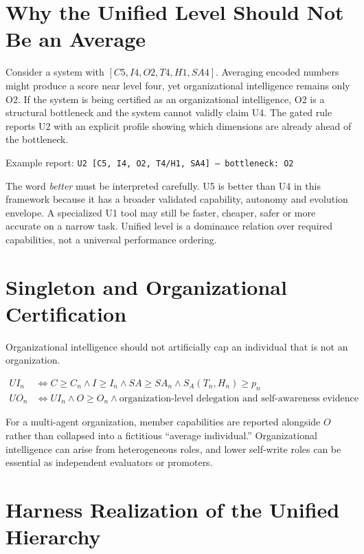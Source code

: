 \documentclass[11pt]{article}
\theoremstyle{definition}
\begin{document}
\section{Why the Unified Level Should Not Be an Average}

Consider a system with $[C5, I4, O2, T4, H1, SA4]$. Averaging encoded numbers might produce a score near level four, yet organizational intelligence remains only O2. If the system is being certified as an organizational intelligence, O2 is a structural bottleneck and the system cannot validly claim U4. The gated rule reports U2 with an explicit profile showing which dimensions are already ahead of the bottleneck.

\begin{center}
Example report: \texttt{U2 [C5, I4, O2, T4/H1, SA4] --- bottleneck: O2}
\end{center}

The word \emph{better} must be interpreted carefully. U5 is better than U4 in this framework because it has a broader validated capability, autonomy and evolution envelope. A specialized U1 tool may still be faster, cheaper, safer or more accurate on a narrow task. Unified level is a dominance relation over required capabilities, not a universal performance ordering.

\section{Singleton and Organizational Certification}

Organizational intelligence should not artificially cap an individual that is not an organization.

\begin{align}
UI_n &\iff C \ge C_n \wedge I \ge I_n \wedge SA \ge SA_n \wedge S_A(T_n,H_n) \ge p_n\\
UO_n &\iff UI_n \wedge O \ge O_n \wedge \text{organization-level delegation and self-awareness evidence}
\end{align}

For a multi-agent organization, member capabilities are reported alongside $O$ rather than collapsed into a fictitious ``average individual.'' Organizational intelligence can arise from heterogeneous roles, and lower self-write roles can be essential as independent evaluators or promoters.

\section{Harness Realization of the Unified Hierarchy}
\end{document}
